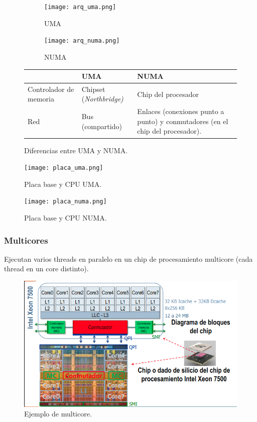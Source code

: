 \documentclass[12pt,spanish]{article}
\begin{document}
\begin{figure}[H]
\centering
\begin{subfigure}{0.3\textwidth}
\texttt{[image: arq\_uma.png]}
\caption{UMA}
\end{subfigure}
\quad
\begin{subfigure}{0.3\textwidth}
\texttt{[image: arq\_numa.png]}
\caption{NUMA}
\end{subfigure}
\vspace{1cm}
\begin{tabular}{|m{3cm}|m{5cm}|m{5cm}|}
\hline
&\textbf{UMA} & \textbf{NUMA} \\
 \hline
Controlador de memoria & Chipset (\textit{Northbridge)} & Chip del procesador \\
\hline
Red & Bus (compartido) & Enlaces (conexiones punto a punto) y conmutadores (en el chip del procesador).\\
\hline
\end{tabular}
\caption{Diferencias entre UMA y NUMA.}
\end{figure}

\begin{figure}[H]
\centering
\texttt{[image: placa\_uma.png]}
\caption{Placa base y CPU UMA.}
\end{figure}

\begin{figure}[H]
\centering
\texttt{[image: placa\_numa.png]}
\caption{Placa base y CPU NUMA.}
\end{figure}


\subsubsection{Multicores}

Ejecutan varios threads en paralelo en un chip de procesamiento multicore (cada thread en un core distinto).

\begin{figure}[H]
\centering
\includegraphics[scale=0.65]{cmp.png}
\caption{Ejemplo de multicore.}
\end{figure}
\end{document}
